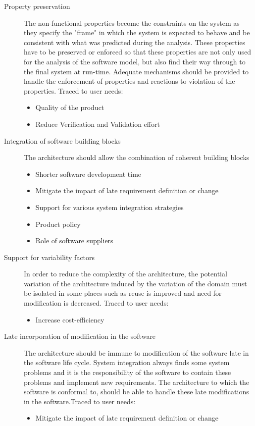 \begin{description}
\item [Property preservation] The non-functional properties become the constraints on the system as they specify the "frame" in which the system is expected to behave and be consistent with what was predicted during the analysis. 
These properties have to be preserved or enforced so that these properties are not only used for the analysis of the software model, but also find their way through to the final system at run-time. Adequate mechanisms should be provided to handle the enforcement of properties and reactions to violation of the properties. Traced to user needs:
\begin{itemize}
\item Quality of the product
\item Reduce Verification and Validation effort
\end{itemize} 

\item [Integration of software building blocks] The architecture should allow the combination of coherent building blocks
\begin{itemize}
\item Shorter software development time
\item Mitigate the impact of late requirement definition or change
\item Support for various system integration strategies
\item Product policy
\item Role of software suppliers 
\end{itemize}

\item [Support for variability factors] In order to reduce the complexity of the architecture, the potential variation of the architecture induced by the variation of the domain must be isolated in some places such as reuse is improved and need for modification is decreased. Traced to user needs:
\begin{itemize}
\item Increase cost-efficiency 
\end{itemize}

\item [Late incorporation of modification in the software] The architecture should be immune to modification of the software late in the software life cycle. System integration always finds some system problems and it is the responsibility of the software to contain these problems and implement new requirements. The architecture to which the software is conformal to, should be able to handle these late modifications in the software.Traced to user needs:
\begin{itemize}
\item Mitigate the impact of late requirement definition or change 
\end{itemize}


\end{description}
